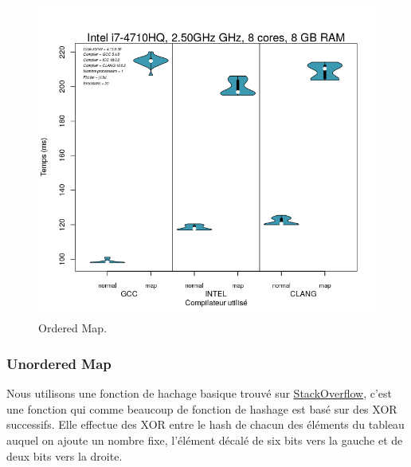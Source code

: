 \documentclass[
 aip,
 jmp,
 amsmath,amssymb,
 reprint
]{revtex4-1}
\begin{document}
\begin{figure}[H]
  \includegraphics[width=\linewidth, keepaspectratio=true]{sorted_map.png}
  \caption{Ordered Map.\label{Fig:ordered_map}}
\end{figure}

\subsubsection{Unordered Map}
Nous utilisons une fonction de hachage basique trouvé sur \href{https://stackoverflow.com/a/42701911}{StackOverflow}, c'est une fonction qui comme beaucoup de fonction de hashage est basé sur des XOR successifs. Elle effectue des XOR entre le hash de chacun des éléments du tableau auquel on ajoute un nombre fixe, l'élément décalé de six bits vers la gauche et de deux bits vers la droite.
\end{document}
